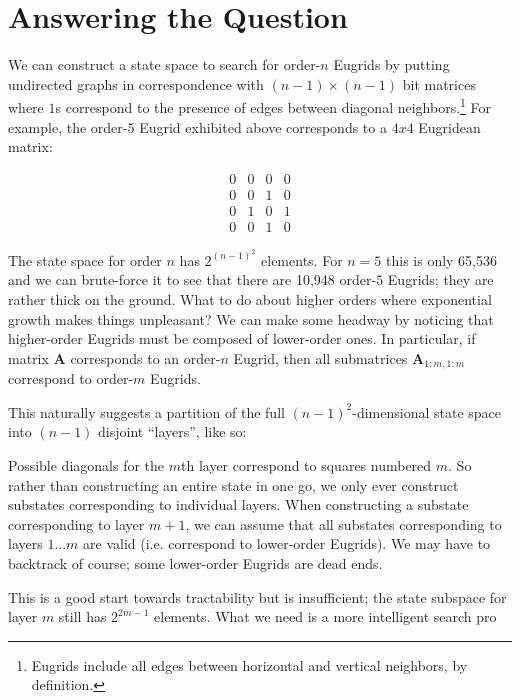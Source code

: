 \documentclass[letterpaper]{article}
\begin{document}
\section{Answering the Question}

We can construct a state space to search for order-$n$ Eugrids by putting undirected graphs
in correspondence with $(n - 1) \times (n - 1)$ bit matrices where $1$s correspond to the
presence of edges between diagonal neighbors.\footnote{Eugrids include all edges between
horizontal and vertical neighbors, by definition.} For example, the order-$5$ Eugrid
exhibited above corresponds to a $4 x 4$ Eugridean matrix:

\begin{equation*}
\begin{matrix}
  0 & 0 & 0 & 0 \\
  0 & 0 & 1 & 0 \\
  0 & 1 & 0 & 1 \\
  0 & 0 & 1 & 0
\end{matrix}
\end{equation*}

The state space for order $n$ has $2^{(n-1)^2}$ elements. For $n=5$ this is only 65,536 and
we can brute-force it to see that there are 10,948 order-$5$ Eugrids; they are rather thick
on the ground. What to do about higher orders where exponential growth makes things
unpleasant? We can make some headway by noticing that higher-order Eugrids must be composed
of lower-order ones. In particular, if matrix $\mathbf{A}$ corresponds to an order-$n$
Eugrid, then all submatrices $\mathbf{A}_{1:m,1:m}$ correspond to order-$m$ Eugrids.

This naturally suggests a partition of the full $(n-1)^2$-dimensional state space into
$(n-1)$ disjoint ``layers'', like so:

\begin{center}
  
\end{center}

Possible diagonals for the $m$th layer correspond to squares numbered $m$. So rather than
constructing an entire state in one go, we only ever construct substates corresponding to
individual layers. When constructing a substate corresponding to layer $m+1$, we can assume
that all substates corresponding to layers $1 \ldots m$ are valid (i.e. correspond to
lower-order Eugrids). We may have to backtrack of course; some lower-order Eugrids are dead
ends.

This is a good start towards tractability but is insufficient; the state subspace for layer
$m$ still has $2^{2m-1}$ elements. What we need is a more intelligent search pro
\end{document}
